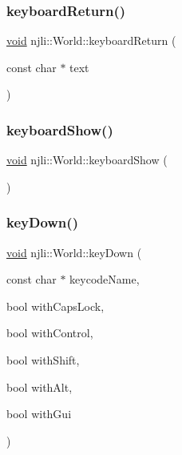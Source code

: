 \mbox{\label{classnjli_1_1_world_a6e7f30cb39fb2cc23148a3765d0fed3e}} 
\subsubsection{\texorpdfstring{keyboard\+Return()}{keyboardReturn()}}
{\footnotesize\ttfamily \mbox{\hyperlink{_thread_8h_af1e856da2e658414cb2456cb6f7ebc66}{void}} njli\+::\+World\+::keyboard\+Return (\begin{DoxyParamCaption}\item[{const char $\ast$}]{text }\end{DoxyParamCaption})}

\mbox{\label{classnjli_1_1_world_abd97ee22f8fbfa29ace0f4859b16d6e0}} 
\subsubsection{\texorpdfstring{keyboard\+Show()}{keyboardShow()}}
{\footnotesize\ttfamily \mbox{\hyperlink{_thread_8h_af1e856da2e658414cb2456cb6f7ebc66}{void}} njli\+::\+World\+::keyboard\+Show (\begin{DoxyParamCaption}{ }\end{DoxyParamCaption})}

\mbox{\label{classnjli_1_1_world_a6fc507c345272128f64cd5c6d4e6ca08}} 
\subsubsection{\texorpdfstring{key\+Down()}{keyDown()}}
{\footnotesize\ttfamily \mbox{\hyperlink{_thread_8h_af1e856da2e658414cb2456cb6f7ebc66}{void}} njli\+::\+World\+::key\+Down (\begin{DoxyParamCaption}\item[{const char $\ast$}]{keycode\+Name,  }\item[{bool}]{with\+Caps\+Lock,  }\item[{bool}]{with\+Control,  }\item[{bool}]{with\+Shift,  }\item[{bool}]{with\+Alt,  }\item[{bool}]{with\+Gui }\end{DoxyParamCaption})}

